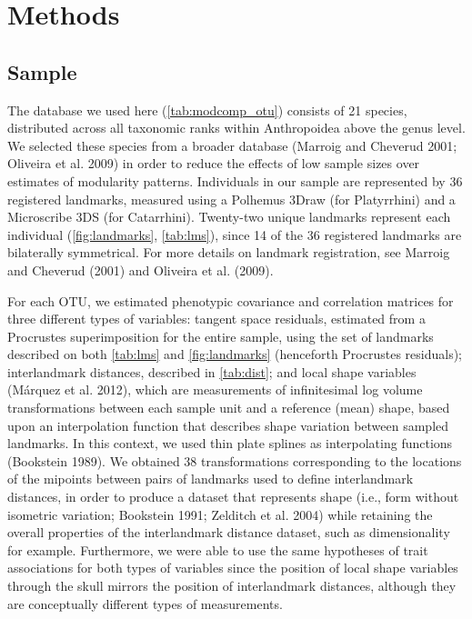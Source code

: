 \documentclass[12pt,]{article}
\begin{document}
\section{Methods}\label{methods}

\subsection{Sample}\label{sample}

The database we used here (\autoref{tab:modcomp_otu}) consists of 21
species, distributed across all taxonomic ranks within Anthropoidea
above the genus level. We selected these species from a broader database
(Marroig and Cheverud 2001; Oliveira et al. 2009) in order to reduce the
effects of low sample sizes over estimates of modularity patterns.
Individuals in our sample are represented by 36 registered landmarks,
measured using a Polhemus 3Draw (for Platyrrhini) and a Microscribe 3DS
(for Catarrhini). Twenty-two unique landmarks represent each individual
(\autoref{fig:landmarks}, \autoref{tab:lms}), since 14 of the 36
registered landmarks are bilaterally symmetrical. For more details on
landmark registration, see Marroig and Cheverud (2001) and Oliveira et
al. (2009).



For each OTU, we estimated phenotypic covariance and correlation
matrices for three different types of variables: tangent space
residuals, estimated from a Procrustes superimposition for the entire
sample, using the set of landmarks described on both \autoref{tab:lms}
and \autoref{fig:landmarks} (henceforth Procrustes residuals);
interlandmark distances, described in \autoref{tab:dist}; and local
shape variables (Márquez et al. 2012), which are measurements of
infinitesimal log volume transformations between each sample unit and a
reference (mean) shape, based upon an interpolation function that
describes shape variation between sampled landmarks. In this context, we
used thin plate splines as interpolating functions (Bookstein 1989). We
obtained 38 transformations corresponding to the locations of the
mipoints between pairs of landmarks used to define interlandmark
distances, in order to produce a dataset that represents shape (i.e.,
form without isometric variation; Bookstein 1991; Zelditch et al. 2004)
while retaining the overall properties of the interlandmark distance
dataset, such as dimensionality for example. Furthermore, we were able
to use the same hypotheses of trait associations for both types of
variables since the position of local shape variables through the skull
mirrors the position of interlandmark distances, although they are
conceptually different types of measurements.
\end{document}
